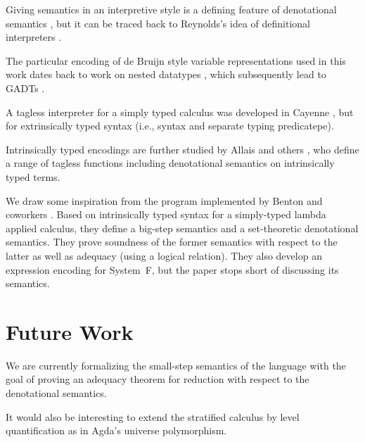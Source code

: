 \documentclass[acmsmall,anonymous,review,screen]{acmart}
\begin{document}
Giving semantics in an interpretive style is a defining feature of
denotational semantics \cite{Schmidt1986}, but it can be traced back
to Reynolds's idea of definitional interpreters \cite{Reynolds1975}.

The particular encoding of de Bruijn style variable representations
used in this work dates back to work on nested datatypes
\cite{DBLP:conf/mpc/BirdM98,DBLP:journals/jfp/BirdP99,DBLP:conf/csl/AltenkirchR99},
which subsequently lead to GADTs
\cite{cheney03:_first_class_phant_types}.

A tagless interpreter for a simply typed calculus was developed in
Cayenne \cite{augustsson99}, but for extrinsically typed syntax (i.e.,
syntax and separate typing predicatepe).

Intrinsically typed encodings are further studied by Allais and others
\cite{DBLP:conf/cpp/Allais0MM17}, who define a range of tagless
functions including denotational semantics on intrinsically typed
terms. 

We draw some inspiration from the program implemented by Benton and coworkers
\cite{DBLP:journals/jar/BentonHKM12}. Based on intrinsically typed
syntax for a simply-typed lambda applied calculus, they define a
big-step semantics and a set-theoretic denotational semantics. They
prove soundness of the former semantics with respect to the latter as
well as adequacy (using a logical relation). They also develop an
expression encoding for System~F, but the paper stops short of
discussing its semantics. 

\section{Future Work}
\label{sec:future-work}

We are currently formalizing the small-step semantics of the language
with the goal of proving an adequacy theorem for reduction with
respect to the denotational semantics.

It would also be interesting to extend the stratified calculus by
level quantification as in Agda's universe polymorphism.







\end{document}
